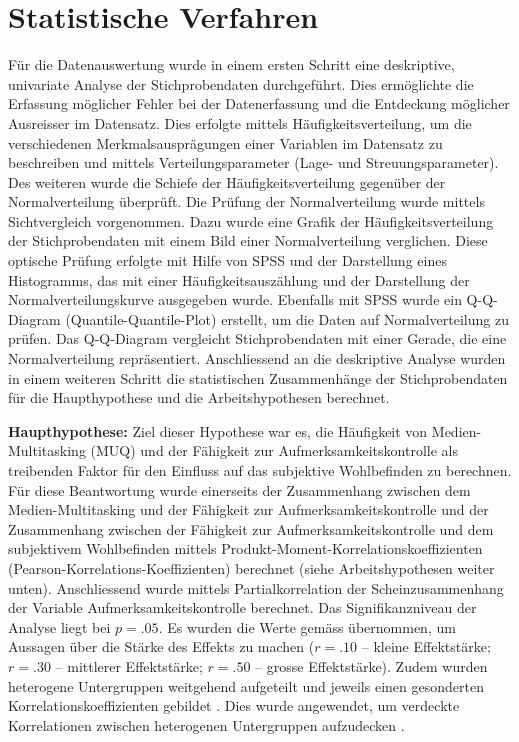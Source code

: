\section{Statistische Verfahren}\label{section.statistischeVerfahren}
Für die Datenauswertung wurde in einem ersten Schritt eine deskriptive, univariate Analyse der Stichprobendaten durchgeführt. Dies ermöglichte die Erfassung möglicher Fehler bei der Datenerfassung und die Entdeckung möglicher Ausreisser im Datensatz. Dies erfolgte mittels Häufigkeitsverteilung, um die verschiedenen Merkmalsausprägungen einer Variablen im Datensatz zu beschreiben und mittels Verteilungsparameter (Lage- und Streuungsparameter). Des weiteren wurde die Schiefe der Häufigkeitsverteilung gegenüber der Normalverteilung überprüft. Die Prüfung der Normalverteilung wurde mittels Sichtvergleich vorgenommen. Dazu wurde eine Grafik der Häufigkeitsverteilung der Stichprobendaten mit einem Bild einer Normalverteilung verglichen. Diese optische Prüfung erfolgte mit Hilfe von SPSS und der Darstellung eines Histogramms, das mit einer Häufigkeitsauszählung und der Darstellung der Normalverteilungskurve ausgegeben wurde. Ebenfalls mit SPSS wurde ein Q-Q-Diagram (Quantile-Quantile-Plot) erstellt, um die Daten auf Normalverteilung zu prüfen. Das Q-Q-Diagram vergleicht Stichprobendaten mit einer Gerade, die eine Normalverteilung repräsentiert. Anschliessend an die deskriptive Analyse wurden in einem weiteren Schritt die statistischen Zusammenhänge der Stichprobendaten für die Haupthypothese und die Arbeitshypothesen berechnet. 
\par 
\textbf{Haupthypothese:} Ziel dieser Hypothese war es, die Häufigkeit von Medien-Multitasking (MUQ) und der Fähigkeit zur Aufmerksamkeitskontrolle als treibenden Faktor für den Einfluss auf das subjektive Wohlbefinden zu berechnen. Für diese Beantwortung wurde einerseits der Zusammenhang zwischen dem Medien-Multitasking und der Fähigkeit zur Aufmerksamkeitskontrolle und der Zusammenhang zwischen der Fähigkeit zur Aufmerksamkeitskontrolle und dem subjektivem Wohlbefinden mittels Produkt-Moment-Korrelationskoeffizienten (Pearson-Korrelations-Koeffizienten) berechnet (siehe Arbeitshypothesen weiter unten). Anschliessend wurde mittels Partialkorrelation der Scheinzusammenhang der Variable Aufmerksamkeitskontrolle berechnet. Das Signifikanzniveau der Analyse liegt bei $p=.05$. Es wurden die Werte gemäss \cite{Cohen1988} übernommen, um Aussagen über die Stärke des Effekts zu machen ($r=.10$ -- kleine Effektstärke; $r=.30$ -- mittlerer Effektstärke; $r=.50$ -- grosse Effektstärke). Zudem wurden heterogene Untergruppen weitgehend aufgeteilt und jeweils einen gesonderten Korrelationskoeffizienten gebildet \cite{Renkewitz2008}. Dies wurde angewendet, um verdeckte Korrelationen zwischen heterogenen Untergruppen aufzudecken \cite{Ebermann2014}.
